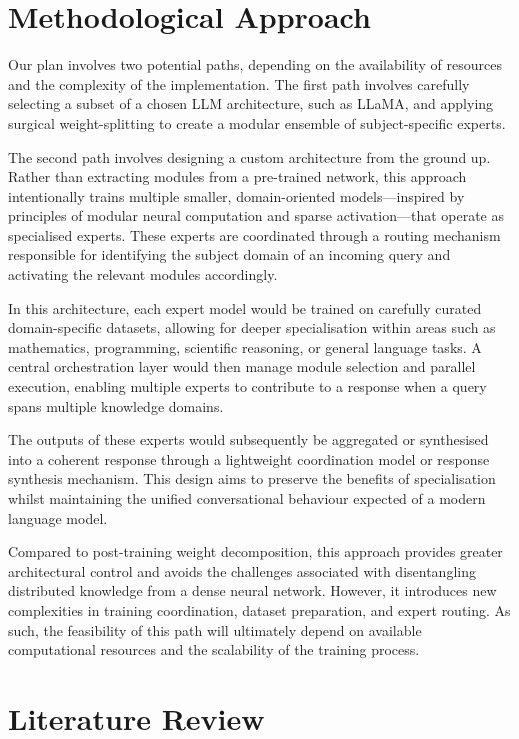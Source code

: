 \documentclass[conference]{IEEEtran}
\begin{document}
\section{Methodological Approach}
	Our plan involves two potential paths, depending on the availability of resources and the complexity of the implementation. The first path involves carefully selecting a subset of a chosen LLM architecture, such as LLaMA, and applying surgical weight-splitting to create a modular ensemble of subject-specific experts.
	
	The second path involves designing a custom architecture from the ground up. Rather than extracting modules from a pre-trained network, this approach intentionally trains multiple smaller, domain-oriented models—inspired by principles of modular neural computation and sparse activation—that operate as specialised experts. These experts are coordinated through a routing mechanism responsible for identifying the subject domain of an incoming query and activating the relevant modules accordingly.
	
	In this architecture, each expert model would be trained on carefully curated domain-specific datasets, allowing for deeper specialisation within areas such as mathematics, programming, scientific reasoning, or general language tasks. A central orchestration layer would then manage module selection and parallel execution, enabling multiple experts to contribute to a response when a query spans multiple knowledge domains.
	
	The outputs of these experts would subsequently be aggregated or synthesised into a coherent response through a lightweight coordination model or response synthesis mechanism. This design aims to preserve the benefits of specialisation whilst maintaining the unified conversational behaviour expected of a modern language model.
	
	Compared to post-training weight decomposition, this approach provides greater architectural control and avoids the challenges associated with disentangling distributed knowledge from a dense neural network. However, it introduces new complexities in training coordination, dataset preparation, and expert routing. As such, the feasibility of this path will ultimately depend on available computational resources and the scalability of the training process.

\section{Literature Review}
\end{document}
